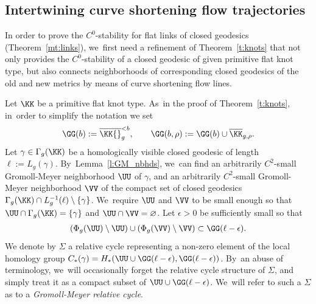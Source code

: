 \subsection{Intertwining curve shortening flow trajectories}

In order to prove the $C^0$-stability for flat links of closed geodesics (Theorem~\ref{mt:links}), we~first need a refinement of Theorem~\ref{t:knots} that not only provides the $C^0$-stability of a closed geodesic of given primitive flat knot type, but also connects neighborhoods of corresponding closed geodesics of the old and new metrics by means of curve shortening flow lines.

Let $\KK$ be a primitive flat knot type. As~in the proof of Theorem~\ref{t:knots}, in~order to simplify the notation we set
\begin{align*}
\GG(b):=
\overline\KK{}_{g}^{<b},
\qquad
\GG(b,\rho):=
\GG(b)\cup\overline\KK_{g,\rho}.
\end{align*}
Let $\gamma\in\Gamma_g(\KK)$ be a homologically visible closed geodesic of length $\ell:=L_g(\gamma)$. By~Lem\-ma~\ref{l:GM_nbhds}, we~can find an arbitrarily $C^2$-small Gromoll-Meyer neighborhood $\UU$ of $\gamma$, and an arbitrarily $C^2$-small Gromoll-Meyer neighborhood $\VV$ of the compact set of closed geodesics $\Gamma_g(\KK)\cap L_g^{-1}(\ell)\setminus\{\gamma\}$. We~require $\UU$ and $\VV$ to be small enough so that $\UU\cap\Gamma_g(\KK)=\{\gamma\}$ and $\UU\cap\VV=\varnothing$. Let $\epsilon>0$ be sufficiently small so that
\begin{align}
\label{e:GM_property_U'_V'}
(\Phi_g(\UU)\setminus\UU) \cup (\Phi_g(\VV)\setminus\VV)\subset\GG(\ell-\epsilon).
\end{align}
We denote by $\Sigma$ a relative cycle representing a non-zero element of the local homology group $C_*(\gamma)=H_*(\UU\cup \GG(\ell-\epsilon),\GG(\ell-\epsilon))$. By~an abuse of terminology, we~will occasionally forget the relative cycle structure of $\Sigma$, and simply treat it as a compact subset of $\UU\cup \GG(\ell-\epsilon)$. We~will refer to such a $\Sigma$ as to a \emph{Gromoll-Meyer relative cycle}.

